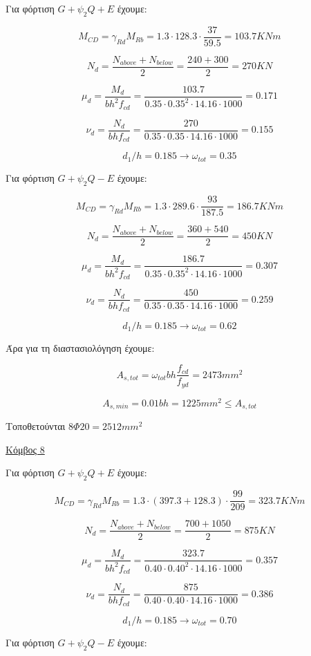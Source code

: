 \noindent
Για φόρτιση $G+\psi_2Q+E$ έχουμε:

\[
M_{CD}=\gamma_{Rd}M_{Rb} = 1.3\cdot128.3\cdot\dfrac{37}{59.5} =103.7 KNm 
\]

\[
N_d = \dfrac{N_{above}+N_{below}}{2}=\dfrac{240+300}{2}=270 KN
\]

\[
\mu_d = \dfrac{M_d}{bh^2f_{cd}}=\dfrac{103.7}{0.35\cdot0.35^2\cdot14.16\cdot1000}=0.171
\]

\[
\nu_d = \dfrac{N_d}{bhf_{cd}}=\dfrac{270}{0.35\cdot0.35\cdot14.16\cdot1000}=0.155
\]

\[
d_1/h = 0.185 \rightarrow \omega_{tot}= 0.35
\]

\noindent
Για φόρτιση $G+\psi_2Q-E$ έχουμε:

\[
M_{CD}=\gamma_{Rd}M_{Rb} = 1.3\cdot289.6\cdot\dfrac{93}{187.5} =186.7 KNm 
\]

\[
N_d = \dfrac{N_{above}+N_{below}}{2}=\dfrac{360+540}{2}=450 KN
\]

\[
\mu_d = \dfrac{M_d}{bh^2f_{cd}}=\dfrac{186.7}{0.35\cdot0.35^2\cdot14.16\cdot1000}=0.307
\]

\[
\nu_d = \dfrac{N_d}{bhf_{cd}}=\dfrac{450}{0.35\cdot0.35\cdot14.16\cdot1000}=0.259
\]

\[
d_1/h = 0.185 \rightarrow \omega_{tot}= 0.62
\]

\noindent
Άρα για τη διαστασιολόγηση έχουμε:

\[
A_{s,tot}=\omega_{tot} b h \dfrac{f_{cd}}{f_{yd}} = 2473 mm^2
\]

\[
A_{s,min}=0.01b h = 1225 mm^2 \leq A_{s,tot}
\]

\noindent
Τοποθετούνται $8\Phi20 = 2512 mm^2$

\bigskip

\noindent
\underline{Κόμβος 8}

\bigskip

\noindent
Για φόρτιση $G+\psi_2Q+E$ έχουμε:

\[
M_{CD}=\gamma_{Rd}M_{Rb} = 1.3\cdot(397.3+128.3)\cdot\dfrac{99}{209} =323.7 KNm 
\]

\[
N_d = \dfrac{N_{above}+N_{below}}{2}=\dfrac{700+1050}{2}=875 KN
\]

\[
\mu_d = \dfrac{M_d}{bh^2f_{cd}}=\dfrac{323.7}{0.40\cdot0.40^2\cdot14.16\cdot1000}=0.357
\]

\[
\nu_d = \dfrac{N_d}{bhf_{cd}}=\dfrac{875}{0.40\cdot0.40\cdot14.16\cdot1000}=0.386
\]

\[
d_1/h = 0.185 \rightarrow \omega_{tot}= 0.70
\]

\noindent
Για φόρτιση $G+\psi_2Q-E$ έχουμε:

